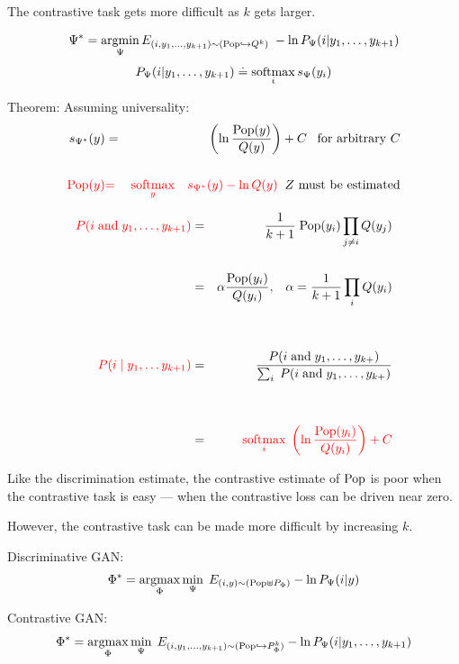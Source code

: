 {\vfill
The contrastive task gets more difficult as $k$ gets larger.



$$\Psi^* = \operatorname*{argmin}_\Psi E_{(i,y_1,\ldots,y_{k+1}) \sim (\mathrm{Pop}\hookrightarrow Q^k)} \;- \ln P_\Psi(i|y_1,\ldots,y_{k+1})$$
{\color{red} $$P_\Psi(i|y_1,\ldots,y_{k+1}) \doteq \operatorname*{softmax}_i s_\Psi(y_i)$$}

\vfill
{\color{red} Theorem}: Assuming universality:
\begin{eqnarray*}
s_{\Psi^*}(y) & = & \left(\ln \frac{\mathrm{Pop}(y)}{Q(y)}\right) + C \;\;\;\mbox{for arbitrary $C$}\\
\\
{\color{red} \mathrm{Pop}(y)} & {\color{red} =} & {\color{red} \operatorname*{softmax}_y\;\;\; s_{\Psi^*}(y) - \ln Q(y)}\;\;\mbox{$Z$ must be estimated}
\end{eqnarray*}


{\huge
\begin{eqnarray*}
{\color{red} P(i \;\mathrm{and}\;y_1,\ldots,y_{k+1})} & = & \frac{1}{k+1}\;\mathrm{Pop}(y_i)\prod_{j \not = i}Q(y_j) \\
\\
& = & \alpha \frac{\mathrm{Pop}(y_i)}{Q(y_i)},\;\;\;\alpha = \frac{1}{k+1} \prod_i Q(y_i) \\
\\
\\
{\color{red} P(i\;|\;y_1,\ldots y_{k+1})} & = & \frac{P(i\;\mbox{and} \; y_1,\ldots,y_{k+})}{\sum_i \;P(i \;\mbox{and}\; y_1,\ldots,y_{k+})} \\
\\
\\
& = & {\color{red} \operatorname*{softmax}_i\; \left(\ln \frac{\mathrm{Pop}(y_i)}{Q(y_i)}\right) + C}
\end{eqnarray*}
}


Like the discrimination estimate, the contrastive estimate of $\mathrm{Pop}$ is poor when the contrastive task is easy --- when the contrastive loss can be driven near zero.

\vfill
However, the contrastive task can be made more difficult by increasing $k$.


Discriminative GAN:
{\color{red} $$\Phi^* = \operatorname*{argmax}_\Phi \min_\Psi \;E_{(i,y) \sim (\mathrm{Pop} \uplus P_\Phi)} - \ln P_\Psi(i|y)$$}

\vfill
Contrastive GAN:
{\color{red} $$\Phi^* = \operatorname*{argmax}_\Phi \min_\Psi \;E_{(i,y_1,\ldots,y_{k+1}) \sim (\mathrm{Pop} \hookrightarrow P_\Phi^k)} - \ln P_\Psi(i|y_1,\ldots,y_{k+1})$$}

}

